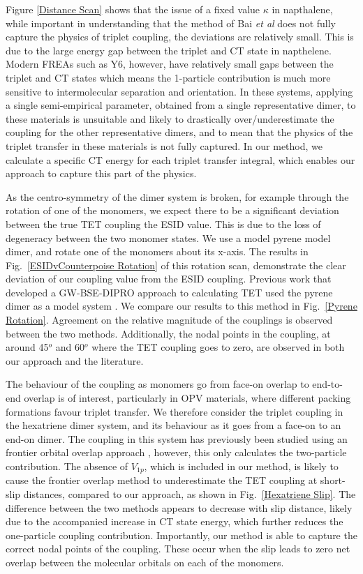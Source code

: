 \documentclass[aps,physrev,reprint,superscriptaddress,nofootinbib,amsmath,amssymb,a4paper]{revtex4-2}
\begin{document}
 Figure \ref{Distance Scan} shows that the issue of a fixed value $\kappa$ in napthalene, while important in understanding that the method of Bai \textit{et al}\cite{Bai2020} does not fully capture the physics of triplet coupling, the deviations are relatively small. This is due to the large energy gap between the triplet and CT state in napthelene. Modern FREAs such as Y6, however, have relatively small gaps between the triplet and CT states\cite{creed2026quantum, Ward2026} which means the 1-particle contribution is much more sensitive to intermolecular separation and orientation. In these systems, applying a single semi-empirical parameter, obtained from a single representative dimer, to these materials is unsuitable and likely to drastically over/underestimate the coupling for the other representative dimers, and to mean that the physics of the triplet transfer in these materials is not fully captured. 
In our method, we calculate a specific CT energy for each triplet transfer integral, which enables our approach to capture this part of the physics. 


As the centro-symmetry of the dimer system is broken, for example through the rotation of one of the monomers, we expect there to be a significant deviation between the true TET coupling the ESID value. This is due to the loss of degeneracy between the two monomer states. We use a model pyrene model dimer, and rotate one of the monomers about its x-axis. The results in Fig.\ \eqref{ESIDvCounterpoise Rotation} of this rotation scan, demonstrate the clear deviation of our coupling value from the ESID coupling. Previous work that developed a GW-BSE-DIPRO approach to calculating TET used the pyrene dimer as a model system \cite{Wehner2017}. We compare our results to this method in Fig.\ \eqref{Pyrene Rotation}. Agreement on the relative magnitude of the couplings is observed between the two methods. Additionally, the nodal points in the coupling, at around 45$^o$ and 60$^o$ where the TET coupling goes to zero, are observed in both our approach and the literature.

The behaviour of the coupling as monomers go from face-on overlap to end-to-end overlap is of interest, particularly in OPV materials, where different packing formations favour triplet transfer. We therefore consider the triplet coupling in the hexatriene dimer system, and its behaviour as it goes from a face-on to an end-on dimer. The coupling in this system has previously been studied using an frontier orbital overlap approach \cite{Hartzler2018}, however, this only calculates the two-particle contribution. The absence of $V_{1p}$, which is included in our method, is likely to cause the frontier overlap method to underestimate the TET coupling at short-slip distances, compared to our approach, as shown in Fig.\ \eqref{Hexatriene Slip}. The difference between the two methods appears to decrease with slip distance, likely due to the accompanied increase in CT state energy, which further reduces the one-particle coupling contribution. Importantly, our method is able to capture the correct nodal points of the coupling. These occur when the slip leads to zero net overlap between the molecular orbitals on each of the monomers. 
\end{document}
